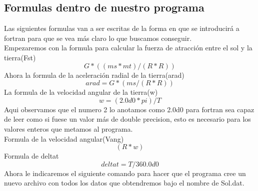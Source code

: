 \documentclass{article}
\begin{document}
\subsection{Formulas dentro de nuestro programa}
Las siguientes formulas van a ser escritas de la forma en que se introducirá a fortran para que se vea más claro lo que buscamos conseguir.\\
Empezaremos con la formula para calcular la fuerza de atracción entre el sol y la tierra(Fst)
\[G*((ms*mt)/(R*R))\]
Ahora la formula de la aceleración radial de la tierra(arad)
\[arad=G*(ms/(R*R))\]
La formula de la velocidad angular de la tierra(w)
\[w=(2.0d0*pi)/T\]
Aqui observamos que el numero 2 lo anotamos como 2.0d0 para fortran sea capaz de leer como si fuese un valor más de double precision, esto es necesario para los valores enteros que metamos al programa.\\
Formula de la velocidad angular(Vang)
\[(R*w)\]
Formula de deltat
\[deltat=T/360.0d0\]
Ahora le indicaremos el siguiente comando para hacer que el programa cree un nuevo archivo con todos los datos que obtendremos bajo el nombre de Sol.dat.
\end{document}
